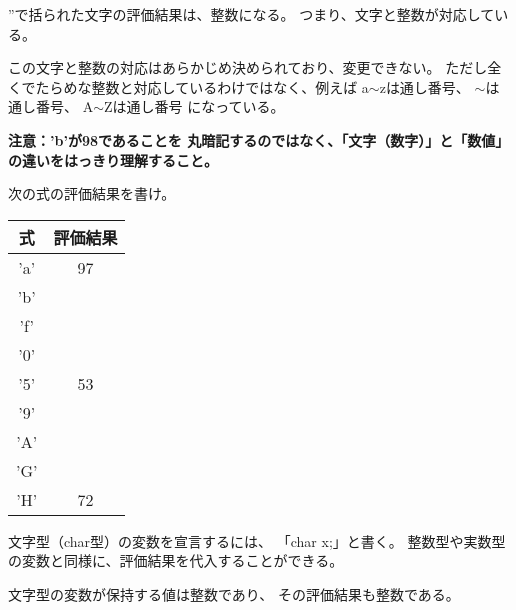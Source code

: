 \documentclass[12pt,a4j]{jarticle}
\newcounter{toi}
\def\toi{%
\bigskip\bigskip\noindent
\addtocounter{toi}{1}
\shadowbox{\bfseries\large 問\thetoi}
\nopagebreak[4]\bigskip\nopagebreak[4]
}
\begin{document}
\begin{multicols}{2}
 
 {\ttfamily ''}で括られた文字の評価結果は、整数になる。
 つまり、文字と整数が対応している。


 この文字と整数の対応はあらかじめ決められており、変更できない。
 ただし全くでたらめな整数と対応しているわけではなく、例えば
 {\ttfamily a}$\sim${\ttfamily z}は通し番号、
 {}$\sim${}は通し番号、
 {\ttfamily A}$\sim${\ttfamily Z}は通し番号
 になっている。



 \noindent
 {\bfseries 注意：{\ttfamily 'b'}が98であることを
 丸暗記するのではなく、「文字（数字）」と「数値」
 の違いをはっきり理解すること。}



 次の式の評価結果を書け。

 \begin{center}\ttfamily%
 \begin{tabular}{|c|c|} \hline
 式 & 評価結果 \\ \hline\hline
 'a' & 97 \\ \hline
 'b' & \\ \hline
 'f' & \\ \hline
 '0' & \\ \hline
 '5' & 53 \\ \hline
 '9' & \\ \hline
 'A' & \\ \hline
 'G' & \\ \hline
 'H' & 72\\ \hline
 \end{tabular}
 \end{center}

\end{multicols}




\toi

文字型（char型）の変数を宣言するには、
「{\ttfamily char x;}」と書く。
整数型や実数型の変数と同様に、評価結果を代入することができる。

文字型の変数が保持する値は整数であり、
その評価結果も整数である。
\end{document}
